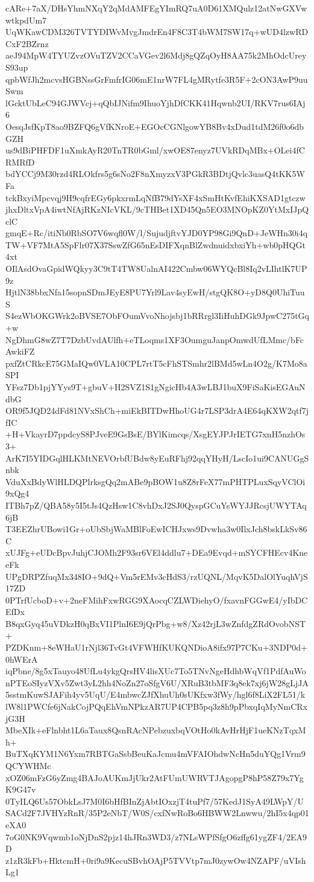 cARe+7aX/DHsYhmNXqY2qMdAMFEgYImRQ7uA0D61XMQulz12atNwGXVwwtkpdUm7
UqWKawCDM326TVTYDIWvMvgJmdrEn4F8C3T4bWM7SW17q+wUD4lzwRDCxF2BZrnz
aeJ94MpW4TYUZvzOVuTZV2CCaVGev2l6Mdj8gQZqOyH8AA75k2MhOdcUreyS93up
qpbWfJh2mcvsHGBNssGrFmfrIG06mE1nrW7FL4gMRytfe3R5F+2cON3AwP9uuSwm
lGcktUbLeC94GJWVcj+qQbIJNifm9IhuoYjhDfCKK41Hqwnb2UI/RKV7rus6IAj6
OesqJsfKpT8ao9BZFQ6gVfKNroE+EGOcCGNlgowYB8Bv4xDud1tdM26f0o6dbGZH
us9dBiPHFDF1uXmkAyR20TnTR0bGml/xwOE87enyz7UVkRDqMBx+OLei4fCRMRfD
bdYCCj9M30rzd4RLOkfrs5g6sNo2F8nXmyzxV3PGkR3BDtjQvlc3uasQ4tKK5WFa
tckBxyiMpcvqj9H9cqfrEGy6pkxrmLqNfB79dYsXF4xSmHtKvfEhiKXSAD1gtczw
jhxDltxVpA4iwtNfAjRKzNIcVKL/9cTHBet1XD45Qn5EO3MNOpKZ0YtMxIJpQclC
gmqE+Rc/itiNb0RbSO7V6wqfl0W/l/SujudjftvYJD0YP98Gi9QnD+JeWHn30i4q
TW+VF7MtA5SpFlr07X37SswZfG65nEsDIFXqnBlZwdnuidxbxiYh+wb0pHQGt4xt
OIlAsdOvaGpidWQkyy3C9tT4TW8UalnAI422Cmbw06WYQcBl8Iq2vLIhtlK7UP9z
HjtlN38bbxNfa15sopnSDmJEyE8PU7Yrl9Lav4syEwH/stgQK8O+yD8Q0UhiTuuS
S4ezWbOKGWrk2oBVSE7ObFOumVvoNhojsbj1bRRrgl3IiHuhDGk9JpwC275tGq+w
NgDhmG8wZ7T7DzbUvdAUlfh+eTLoqms1XF3OumguJanpOmwdUfLMmc/bFcAwkiFZ
pxfZtCRkcE75GMaIQw0VLA10CPL7rtT5cFhSTSmhr2lBMd5wLn4O2g/K7Mo8aSPI
YFsz7Db1pjYYys9T+gbuV+H2SVZ1S1gNgicHb4A3wLBJ1buX9FiSaKisEGAuNdbG
OR9f5JQD24dFd81NVxShCh+miEkBITDwHhoUG4r7LSP3drA4E64qKXW2qtf7jfIC
+H+VkayrD7ppdcyS8PJveE9GsBsE/BYlKimcqs/XsgEYJPJrIETG7xnH5nzhOs3+
ArK7I5YIDGqlHLKMtNEVOrbfUBdw8yEuRFhj92qqYHyH/LscIo1ui9CANUGgSnbk
VduXxBdyWlHLDQPlrksgQq2mABe9pBOW1u8Z8rFeX77mPHTPLuxSqyVClOi9xQg4
ITBh7pZ/QBA58y5I5tJs4QzHsw1C8vhDxJ2SJ0QyspGCuYsWYJJRcsjUWYTAq6jB
T3EEZhrUBowi1Gr+oUbSbjWaMBlFoEwICHJxws9Dvwha3w0IlxJch8bskLkSv86C
xUJFg+eUDcBpvJuhjCJOMh2F93sr6VEl4ddlu7+DEa9Evqd+mSYCFHEcv4KneeFk
UPgDRPZfuqMx348IO+9dQ+Vm5rEMv3cHdS3/rzUQNL/MqvK5DalOlYuqhVjS17ZD
0PTrfUcboD+v+2neFMihFxwRGG9XAocqCZLWDiehyO/fxavnFGGwE4/yIbDCEfDx
B8qxGyq45uVDkzH0qBxVI1PlnI6E9jQrPbg+w8/Xz42rjL3wZnfdgZRdOvobNST+
PZDKnm+8eWHaU1rNjl36TvGt4VFWHfKUKQNDioA8ifx97P7CKu+3NDP0d+0hWErA
iqPbne/8g5xTauyo48UfLu4ykgQrsHV4lisXUc7To5TNvNgeHdhbWqVf1PdfAuWo
nPTEoSIyzVXv5Zwt3yL2hh4NoZn27oSfgV6U/XRuB3tbMF3q8ek7xj6jW28gLjJA
5sstmKuwSJAFih4yv5UqU/E4mbwcZJfXhuUh0sUKfxw3fWy/hgl6f8LiX2FL51/k
lW8l1PWCfe6jNakCojPQqEhVmNPkzAR7UP4CPB5pq3z8h9pPbxqIqMyNmCRxjG3H
MbeXIk+eFlnbht1L6aTaux8QsnRAcNPebzuxbqVOtHo0kAvHrHjF1ueKNzTqxMh+
BuTXqKYM1N6Yxm7RBTGaSsbBeuKaJcmu4mVFAIOhdwNcHn5duYQg1Vrm9QCYWHMc
xOZ06mFzG6yZmg4BAJoAUKmJjUkr2AtFUmUWRVTJAgopgP8hP58Z79x7YgK9G47v
0TyILQ6Us57ObkLsJ7M0I6bHfBInZjAbtIOxzjT4tuPf7/57KedJ1SyA49LWpY/U
SACd2F7JVHYzRnR/35P2eNbT/W0S/cxfNwRoBo6HBWW2Lnwwu/2hI5x4qp01eXA0
7oG0NK9Vqwmb1oNjDnS2pjz14hJRn3WD3/z7NLsWPfSfgO6zffg61ygZF4/2EA9D
z1zR3kFb+HktcmH+0ri9a9KecuSBvhOAjP5TVVtp7mJ0zywOw4NZAPF/uVIshLg1
